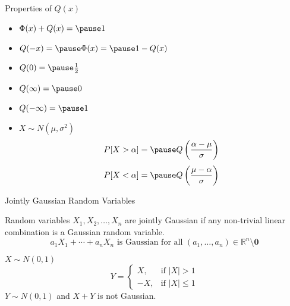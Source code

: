 \documentclass[t]{beamer}
\begin{document}
\begin{frame}{Properties of $Q(x)$}
  \footnotesize
  \begin{itemize}
    \item $\Phi(x) + Q(x) = \pause 1$
    \pause
    \item $Q(-x) = \pause \Phi(x) = \pause 1 - Q(x)$
    \pause
    \item $Q(0) = \pause \frac{1}{2}$
    \pause
    \item $Q(\infty) = \pause 0$
    \pause
    \item $Q(-\infty) = \pause 1$
    \pause
    \item $X \sim N(\mu,\sigma^2)$
      \begin{equation*}
        P[X > \alpha] = \pause Q\left(\frac{\alpha-\mu}{\sigma}\right)
      \end{equation*}
      \pause
      \begin{equation*}
        P[X < \alpha] = \pause Q\left(\frac{\mu-\alpha}{\sigma}\right)
      \end{equation*}
  \end{itemize}
  \normalsize
\end{frame}

\begin{frame}{Jointly Gaussian Random Variables}
  \footnotesize
  \pause
  \begin{definition}
  Random variables $X_1,X_2,\ldots,X_n$ are jointly Gaussian if any non-trivial linear combination is a Gaussian random variable.
  \pause
  \begin{equation*}
    a_1X_1+\cdots+a_nX_n \text{ is Gaussian for all } (a_1,\ldots,a_n) \in \mathbb{R}^n \setminus \mathbf{0}
  \end{equation*}
  \end{definition}
  \pause
  \begin{example}
  $X\sim N(0,1)$
  \begin{equation*}
    Y = \left\{
          \begin{array}{rr}
          X, & \text{if } \lvert X \rvert > 1 \\
          -X, & \text{if } \lvert X \rvert \leq 1 
          \end{array}
        \right.
  \end{equation*}
  \pause
  $Y \sim N(0,1)$ \pause and $X+Y$ is not Gaussian.
  \end{example}
  \normalsize
\end{frame}
\end{document}
